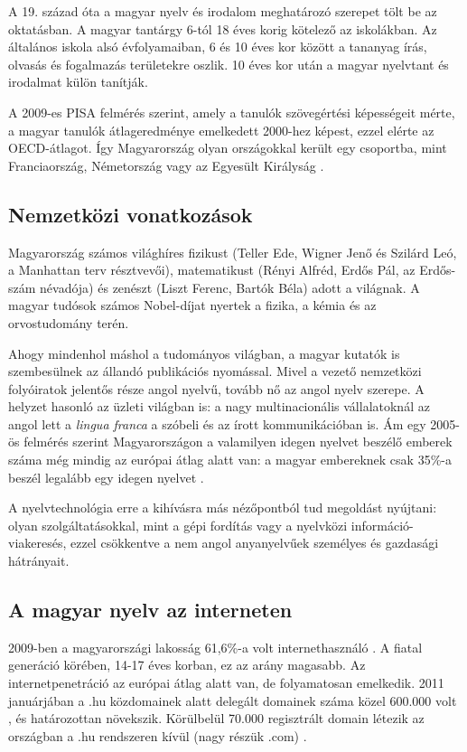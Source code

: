 \begin{multicols}{2}
  A 19. század óta a magyar nyelv és irodalom meghatározó szerepet tölt be az oktatásban. A magyar tantárgy 6-tól 18 éves korig kötelező az iskolákban. Az általános iskola alsó évfolyamaiban, 6 és 10 éves kor között a tananyag írás, olvasás és fogalmazás területekre oszlik. 10 éves kor után a magyar nyelvtant és irodalmat külön tanítják.  

  A 2009-es PISA felmérés  szerint, amely a tanulók szövegértési képességeit mérte, a magyar tanulók átlageredménye emel\-ke\-dett 2000-hez képest, ezzel elérte az OECD-átlagot. Így Magyarország olyan országokkal került egy csoportba, mint Franciaország, Németország vagy az Egye\-sült Királyság \cite{pisa}.    

  \subsection{Nemzetközi vonatkozások}

  Magyarország számos világhíres fizikust (Teller Ede, Wigner Jenő és Szilárd Leó, a Manhattan terv résztvevői), ma\-te\-ma\-ti\-kust (Rényi Alfréd, Erdős Pál, az Erdős-szám névadója) és zenészt (Liszt Ferenc, Bartók Béla) adott a világnak. A ma\-gyar tudósok számos Nobel-díjat nyertek a fizika, a kémia és az orvostudomány terén.

  Ahogy mindenhol máshol a tudományos világban, a magyar kutatók is szembesülnek az állandó publikációs nyomással. Mivel a vezető nemzetközi folyóiratok jelentős része angol nyelvű, tovább nő az angol nyelv szerepe. A helyzet hasonló az üzleti világban is: a nagy multinacionális vállalatoknál az angol lett a \textit{lingua franca} a szóbeli és az írott kommunikációban is. Ám egy 2005-ös felmérés szerint  Ma\-gyar\-or\-szá\-gon a valamilyen idegen nyelvet beszélő emberek száma még mindig az európai átlag alatt van: a magyar embereknek csak 35\%-a beszél legalább egy idegen nyelvet \cite{tarki}. 

  A nyelvtechnológia erre a kihívásra más nézőpontból tud megoldást nyújtani: olyan szolgáltatásokkal, mint a gépi fordítás vagy a nyelvközi információ-viakeresés, ezzel csökkentve a nem angol anya\-nyel\-vű\-ek személyes és gazdasági hátrányait. 

  \subsection{A magyar nyelv az interneten}

  2009-ben a magyarországi lakosság 61,6\%-a volt internethasználó \cite{internet}. A fiatal ge\-ne\-rá\-ció körében, 14-17 éves korban, ez az arány magasabb. Az internetpenetráció az európai átlag alatt van, de fo\-lya\-ma\-to\-san emelkedik. 2011 januárjában a .hu közdomainek alatt delegált domainek száma közel 600.000 volt \cite{domain}, és határozottan növekszik. Körülbelül 70.000 re\-giszt\-rált domain létezik az országban a .hu rendszeren kívül (nagy részük .com) \cite{com}.  


\end{multicols}
